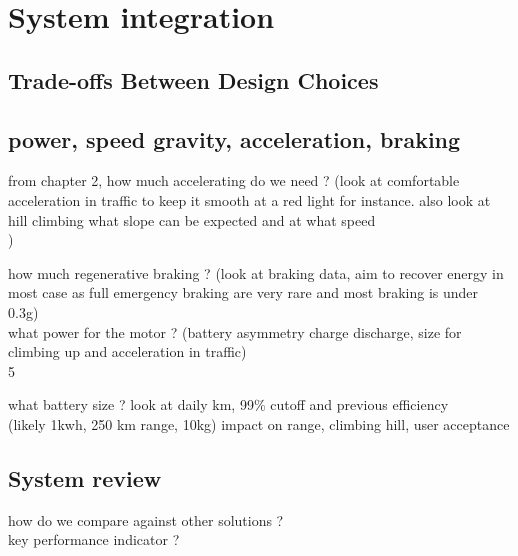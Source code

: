 \section{System integration}

\subsection{Trade-offs Between Design Choices}

\subsection{power, speed gravity, acceleration, braking}

from chapter 2, how much accelerating do we need ? (look at comfortable acceleration in traffic to keep it smooth at a red light for instance. also look at hill climbing what slope can be expected and at what speed\\)

how much regenerative braking ? (look at braking data, aim to recover energy in most case as full emergency braking are very rare and most braking is under 0.3g) \\

what power for the motor ? (battery asymmetry charge discharge, size for climbing up and acceleration in traffic)\\5

what battery size ? look at daily km, 99\% cutoff and previous efficiency\\
(likely 1kwh, 250 km range, 10kg)
impact on range, climbing hill, user acceptance \\

\subsection{System review}
how do we compare against other solutions ?\\
key performance indicator ? \\
